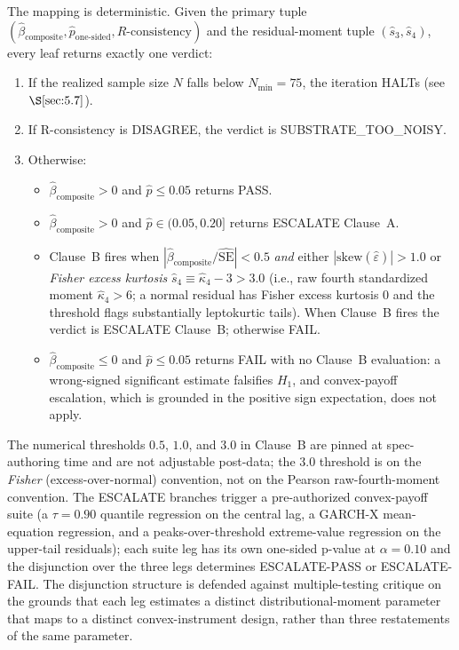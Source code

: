 The mapping is deterministic. Given the primary tuple
\((\hat{\beta}_{\mathrm{composite}}, \hat{p}_{\mathrm{one\text{-}sided}},
R\text{-consistency})\) and the residual-moment tuple
\((\hat{s}_3, \hat{s}_4)\), every leaf returns exactly one verdict:
\begin{enumerate}
  \item If the realized sample size \(N\) falls below \(N_{\min} = 75\),
    the iteration HALTs (see \(\S\ref{sec:5.7}\)).
  \item If R-consistency is DISAGREE, the verdict is
    SUBSTRATE\_TOO\_NOISY.
  \item Otherwise:
    \begin{itemize}
      \item \(\hat{\beta}_{\mathrm{composite}} > 0\) and
        \(\hat{p} \leq 0.05\) returns PASS.
      \item \(\hat{\beta}_{\mathrm{composite}} > 0\) and
        \(\hat{p} \in (0.05, 0.20]\) returns ESCALATE Clause~A.
      \item Clause~B fires when
        \(|\hat{\beta}_{\mathrm{composite}}/\widehat{\mathrm{SE}}| < 0.5\)
        \emph{and} either
        \(|\mathrm{skew}(\hat{\varepsilon})| > 1.0\) or
        \emph{Fisher excess kurtosis}
        \(\hat{s}_4 \equiv \hat{\kappa}_4 - 3 > 3.0\) (i.e., raw fourth
        standardized moment \(\hat{\kappa}_4 > 6\); a normal residual
        has Fisher excess kurtosis \(0\) and the threshold flags
        substantially leptokurtic tails). When Clause~B fires the
        verdict is ESCALATE Clause~B; otherwise FAIL.
      \item \(\hat{\beta}_{\mathrm{composite}} \leq 0\) and
        \(\hat{p} \leq 0.05\) returns FAIL with no Clause~B evaluation:
        a wrong-signed significant estimate falsifies \(H_1\), and
        convex-payoff escalation, which is grounded in the positive
        sign expectation, does not apply.
    \end{itemize}
\end{enumerate}
The numerical thresholds \(0.5\), \(1.0\), and \(3.0\) in Clause~B are
pinned at spec-authoring time and are not adjustable post-data; the
\(3.0\) threshold is on the \emph{Fisher} (excess-over-normal)
convention, not on the Pearson raw-fourth-moment convention. The
ESCALATE branches trigger a pre-authorized convex-payoff suite (a
\(\tau = 0.90\) quantile regression on the central lag, a GARCH-X
mean-equation regression, and a peaks-over-threshold extreme-value
regression on the upper-tail residuals); each suite leg has its own
one-sided p-value at \(\alpha = 0.10\) and the disjunction over the
three legs determines ESCALATE-PASS or ESCALATE-FAIL. The disjunction
structure is defended against multiple-testing critique on the grounds
that each leg estimates a distinct distributional-moment parameter that
maps to a distinct convex-instrument design, rather than three
restatements of the same parameter.

